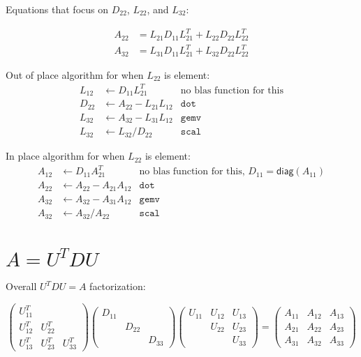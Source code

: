 \documentclass[12pt]{article}
\begin{document}
Equations that focus on $D_{22}$, $L_{22}$, and $L_{32}$:

\begin{align*}
A_{22} &= L_{21}D_{11}L_{21}^T + L_{22}D_{22}L_{22}^T \\
A_{32} &= L_{31}D_{11}L_{21}^T + L_{32}D_{22}L_{22}^T
\end{align*}

Out of place algorithm for when $L_{22}$ is element:
\begin{align*}
L_{12} & \gets D_{11}L_{21}^T        & \text{no blas function for this} \\
D_{22} & \gets A_{22} - L_{21}L_{12} & \texttt{dot} \\
L_{32} & \gets A_{32} - L_{31}L_{12} & \texttt{gemv} \\
L_{32} & \gets L_{32} / D_{22}       & \texttt{scal}
\end{align*}

In place algorithm for when $L_{22}$ is element:
\begin{align*}
A_{12} & \gets D_{11}A_{21}^T        & \text{no blas function for this, $D_{11}=\mathsf{diag}(A_{11})$} \\
A_{22} & \gets A_{22} - A_{21}A_{12} & \texttt{dot} \\
A_{32} & \gets A_{32} - A_{31}A_{12} & \texttt{gemv} \\
A_{32} & \gets A_{32} / A_{22}       & \texttt{scal}
\end{align*}

\section{$A = U^TDU$}

Overall $U^TDU = A$ factorization:

\begin{equation*}
\begin{pmatrix}
U_{11}^T &         &        \\
U_{12}^T & U_{22}^T &        \\
U_{13}^T & U_{23}^T & U_{33}^T
\end{pmatrix}
\begin{pmatrix}
D_{11} &        &        \\
       & D_{22} &        \\
       &        & D_{33}
\end{pmatrix}
\begin{pmatrix}
U_{11} & U_{12} & U_{13} \\
       & U_{22} & U_{23} \\
       &        & U_{33}
\end{pmatrix}
= 
\begin{pmatrix}
A_{11} & A_{12} & A_{13} \\
A_{21} & A_{22} & A_{23} \\
A_{31} & A_{32} & A_{33}
\end{pmatrix}
\end{equation*}
\end{document}
